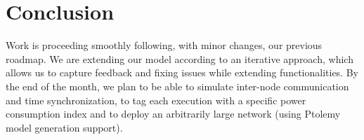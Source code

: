 
\section{Conclusion}
\label{sec:conclusion}

Work is proceeding smoothly following, with minor changes, our previous roadmap. We are extending our model according to an iterative approach, which allows us to capture feedback and fixing issues while extending functionalities. By the end of the month, we plan to be able to simulate inter-node communication and time synchronization, to tag each execution with a specific power consumption index and to deploy an arbitrarily large network (using Ptolemy model generation support).



